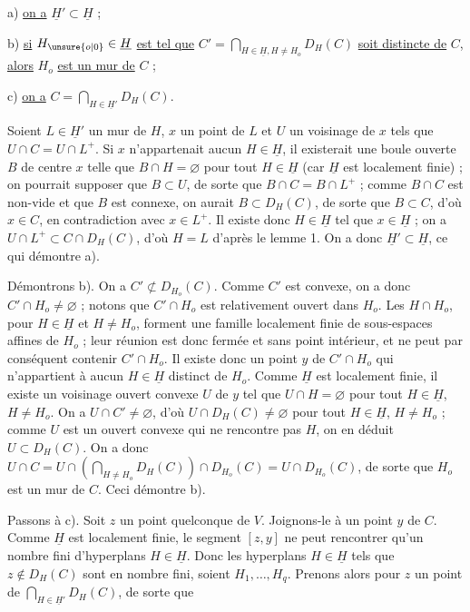 a) \uline{on a} $\underline H'\subset\underline H$ ;

b) \uline{si} $H_{\unsure{o|0}}\in\underline H$ \uline{est tel que} $C'=\displaystyle\bigcap_{H\in\underline H,H\ne H_o}D_H(C)$ \uline{soit distincte de} $C$, \uline{alors} $H_o$ \uline{est un mur de} $C$ ;

c) \uline{on a} $C=\displaystyle\bigcap_{H\in\underline H'}D_H(C)$.

Soient $L\in\underline H'$ un mur de $H$, $x$ un point de $L$ et $U$ un voisinage de $x$ tels que $U\cap C=U\cap L^+$. Si $x$ n'appartenait  aucun $H\in\underline H$, il existerait une boule ouverte $B$ de centre $x$ telle que $B\cap H=\varnothing$ pour tout $H\in\underline H$ (car $\underline H$ est localement finie) ; on pourrait supposer que $B\subset U$, de sorte que $B\cap C=B\cap L^+$ ; comme $B\cap C$ est non-vide et que $B$ est connexe, on aurait $B\subset D_H(C)$, de sorte que $B\subset C$, d'où $x\in C$, en contradiction avec $x\in L^+$. Il existe donc $H\in\underline H$ tel que $x\in\underline H$ ; on a $U\cap L^+\subset C\cap D_H(C)$, d'où $H=L$ d'après le lemme 1. On a donc $\underline H'\subset\underline H$, ce qui démontre a).

Démontrons b). On a $C'\not\subset D_{H_o}(C)$. Comme $C'$ est convexe, on a donc $C'\cap H_o\ne\varnothing$ ; notons que $C'\cap H_o$ est relativement ouvert dans $H_o$. Les $H\cap H_o$, pour $H\in\underline H$ et $H\ne H_o$, forment une famille localement finie de sous-espaces affines de $H_o$ ; leur réunion est donc fermée et sans point intérieur, et ne peut par conséquent contenir $C'\cap H_o$. Il existe donc un point $y$ de $C'\cap H_o$ qui n'appartient à aucun $H\in\underline H$ distinct de $H_o$. Comme $\underline H$ est localement finie, il existe un voisinage ouvert convexe $U$ de $y$ tel que $U\cap H=\varnothing$ pour tout $H\in\underline H$, $H\ne H_o$. On a $U\cap C'\ne\varnothing$, d'où $U\cap D_H(C)\ne\varnothing$ pour tout $H\in\underline H$, $H\ne H_o$ ; comme $U$ est un ouvert convexe qui ne rencontre pas $H$, on en déduit $U\subset D_H(C)$. On a donc $U\cap C=U\cap(\displaystyle\bigcap_{H\ne H_o}D_H(C))\cap D_{H_o}(C)=U\cap D_{H_o}(C)$, de sorte que $H_o$ est un mur de $C$. Ceci démontre b).

Passons à c). Soit $z$ un point quelconque de $V$. Joignons-le à un point $y$ de $C$. Comme $\underline H$ est localement finie, le segment $[z,y]$ ne peut rencontrer qu'un nombre fini \margin{\handwritten{$\vert$}}d'hyperplans $H\in\underline H$. Donc les hyperplans $H\in\underline H$ tels que $z\notin D_H(C)$ sont en nombre fini, soient $H_1,\ldots,H_q$. Prenons alors pour $z$ un point de $\displaystyle\bigcap_{H\in\underline H'}D_H(C)$, de sorte que
